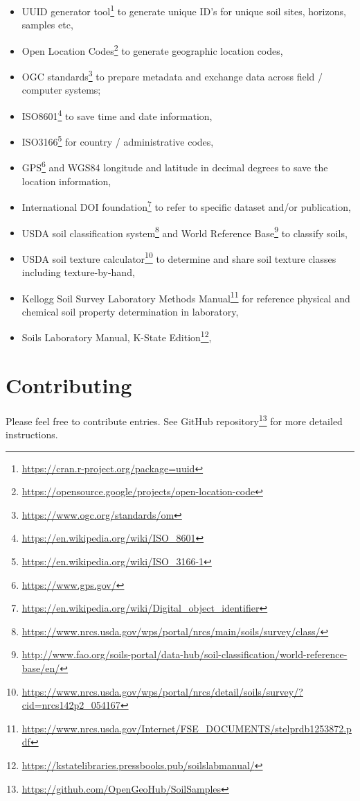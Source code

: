 \documentclass[
  graybox,natbib,nospthms]{svmono}
\providecommand{\tightlist}{%
  \setlength{\itemsep}{0pt}\setlength{\parskip}{0pt}}
\providecommand{\tightlist}{\setlength{\itemsep}{0pt}\setlength{\parskip}{0pt}}
\renewcommand{\href}[2]{#2 (\url{#1})}
\renewcommand{\href}[2]{#2\footnote{\url{#1}}}
\begin{document}
\begin{itemize}
\tightlist
\item
  \href{https://cran.r-project.org/package=uuid}{UUID generator tool} to generate unique ID's for unique soil sites, horizons, samples etc,
\item
  \href{https://opensource.google/projects/open-location-code}{Open Location Codes} to generate geographic location codes,
\item
  \href{https://www.ogc.org/standards/om}{OGC standards} to prepare metadata and exchange data across field / computer systems;
\item
  \href{https://en.wikipedia.org/wiki/ISO_8601}{ISO8601} to save time and date information,
\item
  \href{https://en.wikipedia.org/wiki/ISO_3166-1}{ISO3166} for country / administrative codes,
\item
  \href{https://www.gps.gov/}{GPS} and WGS84 longitude and latitude in decimal degrees to save the location information,
\item
  \href{https://en.wikipedia.org/wiki/Digital_object_identifier}{International DOI foundation} to refer to specific dataset and/or publication,
\item
  \href{https://www.nrcs.usda.gov/wps/portal/nrcs/main/soils/survey/class/}{USDA soil classification system} and \href{http://www.fao.org/soils-portal/data-hub/soil-classification/world-reference-base/en/}{World Reference Base} to classify soils,
\item
  \href{https://www.nrcs.usda.gov/wps/portal/nrcs/detail/soils/survey/?cid=nrcs142p2_054167}{USDA soil texture calculator} to determine and share soil texture classes including texture-by-hand,
\item
  \href{https://www.nrcs.usda.gov/Internet/FSE_DOCUMENTS/stelprdb1253872.pdf}{Kellogg Soil Survey Laboratory Methods Manual} for reference physical and chemical soil property determination in laboratory,
\item
  \href{https://kstatelibraries.pressbooks.pub/soilslabmanual/}{Soils Laboratory Manual, K-State Edition},
\end{itemize}

\hypertarget{contributing}{%
\section{Contributing}\label{contributing}}

Please feel free to contribute entries. See \href{https://github.com/OpenGeoHub/SoilSamples}{GitHub
repository} for more detailed
instructions.
\end{document}
